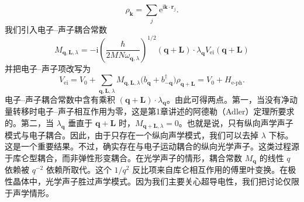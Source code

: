 \begin{equation*}
\rho_{\mathbf{k}}=\sum_j\mathrm{e}^{\mathrm{i}\mathbf{k}\cdot\mathbf{r}_j}.\tag{11.30}
\end{equation*}
我们引入电子–声子耦合常数
\begin{equation*}
M_{\mathbf{q},\mathbf{L},\lambda}=-\mathrm{i}\left(\frac{\hbar}{2MN\omega_{\mathbf{q},\lambda}}\right)^{1/2}(\mathbf{q}+\mathbf{L})\cdot\lambda_{\mathbf{q}}V_{\mathrm{ei}}(\mathbf{q}+\mathbf{L})\tag{11.31}
\end{equation*}
并把电子–声子项改写为
\begin{equation*}
V_{\mathrm{ei}}=V_0+\sum_{\mathbf{q},\mathbf{L},\lambda}M_{\mathbf{q},\mathbf{L},\lambda}\bigl(b_{\mathbf{q}}+b_{-\mathbf{q}}^{\dagger}\bigr)\rho_{\mathbf{q}+\mathbf{L}}=V_0+H_{\text{e-ph}}.\tag{11.32}
\end{equation*}
电子–声子耦合常数中含有乘积 $(\mathbf{q}+\mathbf{L})\cdot\lambda_{\mathbf{q}}$。由此可得两点。第一，当没有净动量转移时电子–声子相互作用为零，这是第1章讲述的阿德勒（Adler）定理所要求的。第二，当 $\lambda_{\mathbf{q}}$ 垂直于 $\mathbf{q}+\mathbf{L}$ 时，$M_{\mathbf{q}+\mathbf{L},\lambda}=0$。也就是说，只有纵向声学声子模式与电子耦合。因此，由于只存在一个纵向声学模式，我们可以去掉 $\lambda$ 下标。这是一个重要结果。不过，确实存在与电子运动耦合的纵向光学声子。这类过程源于库仑型耦合，而非弹性形变耦合。在光学声子的情形，耦合常数 $M_{\mathbf{q}}$ 的线性 $q$ 依赖被 $q^{-2}$ 依赖所取代。这个 $1/q^2$ 反比项来自库仑相互作用的傅里叶变换。在极性晶体中，光学声子胜过声学模式。因为我们主要关心超导电性，我们把讨论仅限于声学情形。

